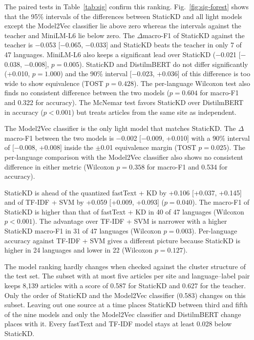 \documentclass{ieeeaccess}
\begin{document}
The paired tests in Table~\ref{tab:sig} confirm this ranking. Fig.~\ref{fig:sig-forest} shows that the 95\% intervals of the differences between StaticKD and all light models except the Model2Vec classifier lie above zero whereas the intervals against the teacher and MiniLM-L6 lie below zero. The $\Delta$macro-F1 of StaticKD against the teacher is $-$0.053 [$-$0.065, $-$0.033] and StaticKD beats the teacher in only 7 of 47 languages. MiniLM-L6 also keeps a significant lead over StaticKD ($-$0.021 [$-$0.038, $-$0.008], $p=0.005$). StaticKD and DistilmBERT do not differ significantly (+0.010, $p=1.000$) and the 90\% interval [$-$0.023, +0.036] of this difference is too wide to show equivalence (TOST $p=0.428$). The per-language Wilcoxon test also finds no consistent difference between the two models ($p=0.604$ for macro-F1 and 0.322 for accuracy). The McNemar test favors StaticKD over DistilmBERT in accuracy ($p<0.001$) but treats articles from the same site as independent.

The Model2Vec classifier is the only light model that matches StaticKD. The $\Delta$macro-F1 between the two models is $-$0.002 [$-$0.009, +0.010] with a 90\% interval of [$-$0.008, +0.008] inside the $\pm$0.01 equivalence margin (TOST $p=0.025$). The per-language comparison with the Model2Vec classifier also shows no consistent difference in either metric (Wilcoxon $p=0.358$ for macro-F1 and 0.534 for accuracy).

StaticKD is ahead of the quantized fastText + KD by +0.106 [+0.037, +0.145] and of TF-IDF + SVM by +0.059 [+0.009, +0.093] ($p=0.040$). The macro-F1 of StaticKD is higher than that of fastText + KD in 40 of 47 languages (Wilcoxon $p<0.001$). The advantage over TF-IDF + SVM is narrower with a higher StaticKD macro-F1 in 31 of 47 languages (Wilcoxon $p=0.003$). Per-language accuracy against TF-IDF + SVM gives a different picture because StaticKD is higher in 24 languages and lower in 22 (Wilcoxon $p=0.127$).

The model ranking hardly changes when checked against the cluster structure of the test set. The subset with at most five articles per site and language--label pair keeps 8,139 articles with a score of 0.587 for StaticKD and 0.627 for the teacher. Only the order of StaticKD and the Model2Vec classifier (0.583) changes on this subset. Leaving out one source at a time places StaticKD between third and fifth of the nine models and only the Model2Vec classifier and DistilmBERT change places with it. Every fastText and TF-IDF model stays at least 0.028 below StaticKD.
\end{document}

